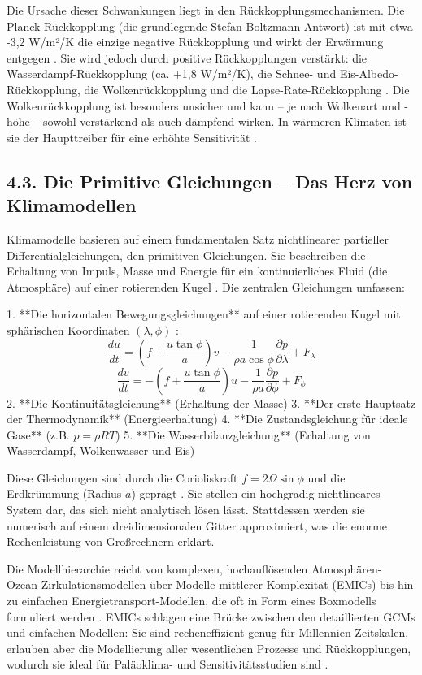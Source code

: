 \documentclass[12pt, a4paper]{article}
\begin{document}
	Die Ursache dieser Schwankungen liegt in den Rückkopplungsmechanismen. Die Planck-Rückkopplung
	(die grundlegende Stefan-Boltzmann-Antwort) ist mit etwa -3,2 W/m²/K die einzige negative
	Rückkopplung und wirkt der Erwärmung entgegen \cite{springer2024}. Sie wird jedoch durch
	positive Rückkopplungen verstärkt: die Wasserdampf-Rückkopplung (ca. +1,8 W/m²/K), die
	Schnee- und Eis-Albedo-Rückkopplung, die Wolkenrückkopplung und die Lapse-Rate-Rückkopplung
	\cite{springer2026}. Die Wolkenrückkopplung ist besonders unsicher und kann – je nach
	Wolkenart und -höhe – sowohl verstärkend als auch dämpfend wirken. In wärmeren Klimaten
	ist sie der Haupttreiber für eine erhöhte Sensitivität \cite{springer2024}.
	
	\subsection*{4.3. Die Primitive Gleichungen – Das Herz von Klimamodellen}
	Klimamodelle basieren auf einem fundamentalen Satz nichtlinearer partieller
	Differentialgleichungen, den primitiven Gleichungen. Sie beschreiben die Erhaltung von
	Impuls, Masse und Energie für ein kontinuierliches Fluid (die Atmosphäre) auf einer
	rotierenden Kugel \cite{ictp2001}. Die zentralen Gleichungen umfassen:
	
	1. **Die horizontalen Bewegungsgleichungen** auf einer rotierenden Kugel mit sphärischen
	Koordinaten \((\lambda, \phi)\) \cite{ictp2001}:
	\[
	\frac{du}{dt} = \left(f + \frac{u \tan \phi}{a}\right)v - \frac{1}{\rho a \cos \phi} \frac{\partial p}{\partial \lambda} + F_\lambda
	\]
	\[
	\frac{dv}{dt} = -\left(f + \frac{u \tan \phi}{a}\right)u - \frac{1}{\rho a} \frac{\partial p}{\partial \phi} + F_\phi
	\]
	2. **Die Kontinuitätsgleichung** (Erhaltung der Masse) 
	3. **Der erste Hauptsatz der Thermodynamik** (Energieerhaltung)
	4. **Die Zustandsgleichung für ideale Gase** (z.B. \(p = \rho R T\))
	5. **Die Wasserbilanzgleichung** (Erhaltung von Wasserdampf, Wolkenwasser und Eis)
	
	Diese Gleichungen sind durch die Corioliskraft \(f = 2\Omega \sin \phi\) und die Erdkrümmung
	(Radius \(a\)) geprägt \cite{ictp2001}. Sie stellen ein hochgradig nichtlineares System dar,
	das sich nicht analytisch lösen lässt. Stattdessen werden sie numerisch auf einem
	dreidimensionalen Gitter approximiert, was die enorme Rechenleistung von Großrechnern erklärt.
	
	Die Modellhierarchie reicht von komplexen, hochauflösenden Atmosphären-Ozean-Zirkulationsmodellen
	über Modelle mittlerer Komplexität (EMICs) bis hin zu einfachen Energietransport-Modellen,
	die oft in Form eines Boxmodells formuliert werden \cite{gmd2018}. EMICs schlagen eine Brücke
	zwischen den detaillierten GCMs und einfachen Modellen: Sie sind recheneffizient genug für
	Millennien-Zeitskalen, erlauben aber die Modellierung aller wesentlichen Prozesse und
	Rückkopplungen, wodurch sie ideal für Paläoklima- und Sensitivitätsstudien sind \cite{gmd2018}.
	
\end{document}
